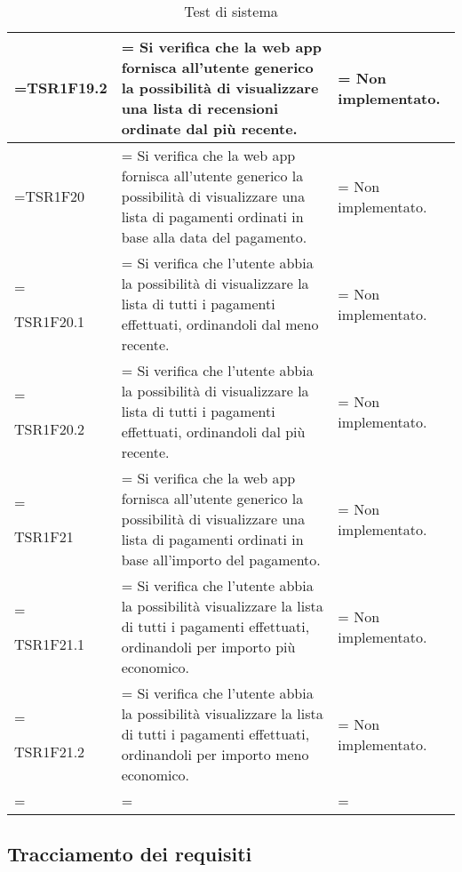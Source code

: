 \begin{xltabular}{\textwidth} {
            >{\hsize\linewidth=\hsize}X
            >{\hsize\linewidth=\hsize}X
            >{\hsize\linewidth=\hsize}X
        }
        TSR1F19.2 &
        Si verifica che la web app fornisca all'utente generico la possibilità di visualizzare una lista di recensioni ordinate dal più recente. &
        Non implementato. 
        \\ \hline

        TSR1F20 &
        Si verifica che la web app fornisca all'utente generico la possibilità di visualizzare una lista di pagamenti ordinati in base alla data del pagamento. &
        Non implementato. 
        \\ \hline

        TSR1F20.1 &
        Si verifica che l'utente abbia la possibilità di visualizzare la lista di tutti i pagamenti
        effettuati, ordinandoli dal meno recente. &
        Non implementato.
        \\ \hline

        TSR1F20.2 &
        Si verifica che l'utente abbia la possibilità di visualizzare la lista di tutti i pagamenti
        effettuati, ordinandoli dal più recente. &
        Non implementato.
        \\ \hline

        TSR1F21 &
        Si verifica che la web app fornisca all'utente generico la possibilità di visualizzare una lista di pagamenti ordinati in base all'importo del pagamento. &
        Non implementato. 
        \\ \hline

        TSR1F21.1 &
        Si verifica che l'utente abbia la possibilità visualizzare la lista di tutti i pagamenti
        effettuati, ordinandoli per importo più economico. &
        Non implementato.
        \\ \hline
        
        TSR1F21.2 &
        Si verifica che l'utente abbia la possibilità visualizzare la lista di tutti i pagamenti
        effettuati, ordinandoli per importo meno economico. &
        Non implementato.
        \\ \hline


        \caption{Test di sistema}
    \end{xltabular}

    \subsection{Tracciamento dei requisiti}

